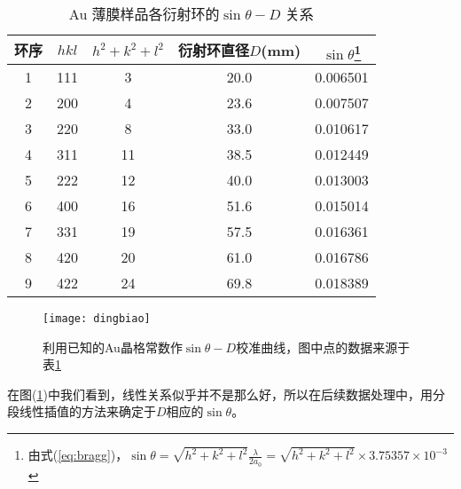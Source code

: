 \documentclass[aps,pre,12pt,preprint,onecolumn,showpacs,showkeys]{revtex4-1}
\begin{document}
    \begin{table}[h]
		\caption{\label{tab:Au}%
		Au 薄膜样品各衍射环的$\sin \theta - D$ 关系}
		\begin{tabular}{|c|c|c|c|c|}
			\hline
			环序&$hkl$&$h^2+k^2+l^2$&衍射环直径$D$(mm)&$\sin \theta$\footnote{由式(\ref{eq:bragg})，$\sin \theta=\sqrt{h^2+k^2+l^2}\frac{\lambda}{2 a_0}=\sqrt{h^2+k^2+l^2}\times 3.75357\times 10^{-3}$}\\\hline
            1 & 111&  3 &  20.0 &  0.006501 \\\hline 
            2 & 200&  4 &  23.6 &  0.007507 \\\hline
            3 & 220&  8 &  33.0 &  0.010617 \\\hline
            4 & 311& 11 &  38.5 &  0.012449 \\\hline
            5 & 222& 12 &  40.0 &  0.013003 \\\hline
            6 & 400& 16 &  51.6 &  0.015014 \\\hline
            7 & 331& 19 &  57.5 &  0.016361 \\\hline
            8 & 420& 20 &  61.0 &  0.016786 \\\hline
            9 & 422& 24 &  69.8 &  0.018389 \\\hline
        \end{tabular}
	\end{table}
    \begin{figure}[ht]
        \centering
        \texttt{[image: dingbiao]}
        \caption{\label{fig:dingbiao}%
        利用已知的Au晶格常数作$\sin \theta -D$校准曲线，图中点的数据来源于表\ref{tab:Au}}
    \end{figure}
    在图(\ref{fig:dingbiao})中我们看到，线性关系似乎并不是那么好，所以在后续数据处理中，用分段线性插值的方法来确定于$D$相应的$\sin\theta$。
\end{document}
